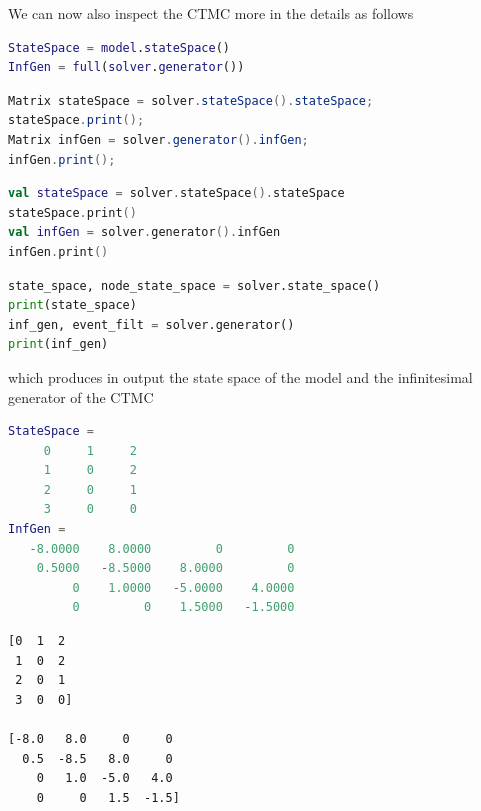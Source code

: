 We can now also inspect the CTMC more in the details as follows
\begin{MATLAB}
\begin{lstlisting}[language = matlab]
StateSpace = model.stateSpace()
InfGen = full(solver.generator())
\end{lstlisting}
\end{MATLAB}
\begin{JAVA}
\begin{lstlisting}[language=java, basicstyle=\ttfamily\scriptsize]
Matrix stateSpace = solver.stateSpace().stateSpace;
stateSpace.print();
Matrix infGen = solver.generator().infGen;
infGen.print();
\end{lstlisting}
\end{JAVA}
\begin{KOTLIN}
\begin{lstlisting}[language=kotlin, basicstyle=\ttfamily\scriptsize]
val stateSpace = solver.stateSpace().stateSpace
stateSpace.print()
val infGen = solver.generator().infGen
infGen.print()
\end{lstlisting}
\end{KOTLIN}
\begin{PYTHON}
\begin{lstlisting}[language=python]
state_space, node_state_space = solver.state_space()
print(state_space)
inf_gen, event_filt = solver.generator()
print(inf_gen)
\end{lstlisting}
\end{PYTHON}
which produces in output the state space of the model and the infinitesimal generator of the CTMC
\begin{MATLAB}
\begin{lstlisting}[language = matlab]
StateSpace =
     0     1     2
     1     0     2
     2     0     1
     3     0     0
InfGen =
   -8.0000    8.0000         0         0
    0.5000   -8.5000    8.0000         0
         0    1.0000   -5.0000    4.0000
         0         0    1.5000   -1.5000
\end{lstlisting}
\end{MATLAB}
\begin{JAVA}
\begin{lstlisting}[basicstyle=\ttfamily\scriptsize]
[0  1  2 
 1  0  2 
 2  0  1 
 3  0  0]

[-8.0   8.0     0     0 
  0.5  -8.5   8.0     0 
    0   1.0  -5.0   4.0 
    0     0   1.5  -1.5]
\end{lstlisting}
\end{JAVA}
